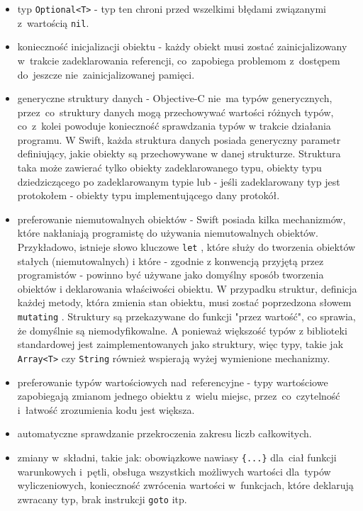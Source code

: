 \documentclass[mgr, shortabstract]{iithesis}
\newcommand{\swiftinline}[1]{
    \texttt{#1}
}
\begin{document}
\begin{itemize}
    \item typ \texttt{Optional<T>} - typ ten chroni przed wszelkimi błędami związanymi z~wartością \texttt{nil}.
    \item konieczność inicjalizacji obiektu - każdy obiekt musi zostać zainicjalizowany w~trakcie zadeklarowania referencji, co~zapobiega problemom z~dostępem do~jeszcze nie~zainicjalizowanej pamięci.
    \item generyczne struktury danych - Objective-C nie~ma typów generycznych, przez~co~struktury danych mogą przechowywać wartości różnych typów, co~z~kolei powoduje konieczność sprawdzania typów w trakcie działania programu. W Swift, każda struktura danych posiada generyczny parametr definiujący, jakie obiekty są przechowywane w danej strukturze. Struktura taka może zawierać tylko obiekty zadeklarowanego typu, obiekty typu dziedziczącego po zadeklarowanym typie lub - jeśli zadeklarowany typ jest protokołem - obiekty typu implementującego dany protokół.
    \item preferowanie niemutowalnych obiektów - Swift posiada kilka mechanizmów, które nakłaniają programistę do używania niemutowalnych obiektów. Przykładowo, istnieje słowo kluczowe \swiftinline{let}, które służy do tworzenia obiektów stałych (niemutowalnych) i które - zgodnie z konwencją przyjętą przez programistów - powinno być używane jako domyślny sposób tworzenia obiektów i deklarowania właściwości obiektu. W przypadku struktur, definicja każdej metody, która zmienia stan obiektu, musi zostać poprzedzona słowem \swiftinline{mutating}. Struktury są przekazywane do funkcji "przez wartość", co sprawia, że domyślnie są niemodyfikowalne. A ponieważ większość typów z biblioteki standardowej jest zaimplementowanych jako struktury, więc typy, takie jak \swiftinline{Array<T>} czy \swiftinline{String} również wspierają wyżej wymienione mechanizmy.
    \item preferowanie typów wartościowych nad~referencyjne - typy wartościowe zapobiegają zmianom jednego obiektu z~wielu miejsc, przez~co~czytelność i~łatwość zrozumienia kodu jest większa.
    \item automatyczne sprawdzanie przekroczenia zakresu liczb całkowitych.
    \item zmiany w~składni, takie jak: obowiązkowe nawiasy \texttt{\{...\}} dla~ciał funkcji warunkowych i~pętli, obsługa wszystkich możliwych wartości dla~typów wyliczeniowych, konieczność zwrócenia wartości w~funkcjach, które deklarują zwracany typ, brak instrukcji \texttt{goto} itp.
\end{itemize}
\end{document}
